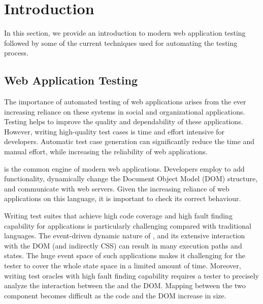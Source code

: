 \chapter{Introduction} \label{chap:intro}
In this section, we provide an introduction to modern web application testing followed by some of the current techniques used for automating the testing process.
 
\section{Web Application Testing} \label{Sec:web-testing}
The importance of automated testing of web applications arises from the ever increasing
reliance on these systems in social and organizational
applications. Testing helps to improve the quality and dependability of these applications. However, writing high-quality test cases is time and effort intensive for developers.
Automatic test case generation can significantly reduce the time and manual effort, while
increasing the reliability of web applications.

\javascript is the common engine of modern web applications. 
Developers employ \javascript to add functionality, dynamically change the Document Object Model (DOM) structure,
and communicate with web servers. Given the increasing reliance of web applications on this language, it is important to check its correct behaviour.

Writing test suites that achieve high code coverage and high fault finding capability for \javascript applications is particularly challenging compared with traditional languages.
The event-driven dynamic nature of \javascript, and its extensive interaction with the DOM (and indirectly CSS) can result in many execution paths and states. The huge event space of such applications makes it challenging for the tester to cover the whole state space in a limited amount of time. Moreover, writing test oracles with high fault finding capability requires a tester to precisely analyze the interaction between the \javascript and the DOM. Mapping between the two component becomes difficult as the \javascript code and the DOM increase in size. 

